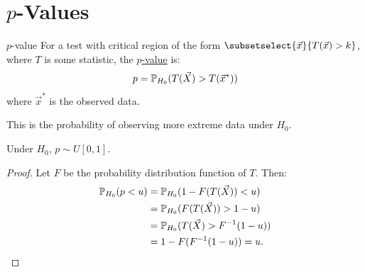 \documentclass[../Main.tex]{subfiles}
\begin{document}
\section{\texorpdfstring{$p$}{p}-Values}
\begin{definition}{$p$-value}
    For a test with critical region of the form $\subsetselect{\vec{x}}{T(\vec{x}) > k}$, where $T$ is some statistic, the \underline{$p$-value} is:
    \begin{equation*}
        p = \P_{H_0}(T(\vec{X}) > T(\vec{x}^*))
    \end{equation*}
    where $\vec{x}^*$ is the observed data.
\end{definition}
\begin{remark}
    This is the probability of observing more extreme data under $H_0$.
\end{remark}
\begin{proposition}
    Under $H_0$, $p \sim U[0, 1]$.
    \label{propPValUnif}
\end{proposition}
\begin{proof}
    Let $F$ be the probability distribution function of $T$. Then:
    \begin{align*}
        \P_{H_0}(p < u) &= \P_{H_0}(1-F(T(\vec{X})) < u) \\
        &= \P_{H_0}(F(T(\vec{X})) > 1-u) \\
        &= \P_{H_0}(T(\vec{X}) > F^{-1}(1-u)) \\
        &= 1 - F(F^{-1}(1-u)) = u.
    \end{align*}
\end{proof}
\end{document}
